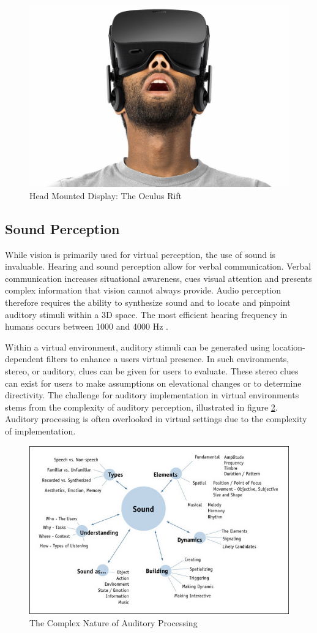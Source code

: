 \documentclass[12pt]{article}
\begin{document}
\begin{figure}[h]
    \centering
 \includegraphics[width=.65\textwidth]{picture11_oculus}
  \caption{Head Mounted Display: The Oculus Rift \cite{oculus}}
  \label{fig:oculus}
 \end{figure}


\subsection{Sound Perception}
While vision is primarily used for virtual perception, the use of sound is invaluable. Hearing and sound perception allow for verbal communication. Verbal communication increases situational awareness, cues visual attention and presents complex information that vision cannot always provide.  Audio perception therefore requires the ability to synthesize sound and to locate and pinpoint auditory stimuli within a 3D space. The most efficient hearing frequency  in humans occurs between 1000 and 4000 Hz \cite{gobbetti}. %

 
\par Within a virtual environment, auditory stimuli can be generated using location-dependent filters to enhance a users virtual presence. In such environments, stereo, or auditory, clues can be given for users to evaluate. These stereo clues can exist for users to make assumptions on elevational changes or to determine directivity. The challenge for auditory implementation in virtual environments stems from the complexity of auditory perception, illustrated in figure \ref{fig:soundPerception}. Auditory processing is often overlooked in virtual settings due to the complexity of implementation.

\begin{figure}[h]
    \centering
 \includegraphics[width=.7\textwidth]{photo8_sound}
  \caption{The Complex Nature of Auditory Processing \cite{sound}}
  \label{fig:soundPerception}
 \end{figure}
\end{document}
